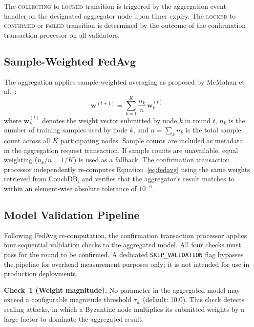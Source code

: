 \documentclass[lettersize,journal]{IEEEtran}
\begin{document}
The \textsc{collecting} to \textsc{locked} transition is triggered by the aggregation
event handler on the designated aggregator node upon timer expiry. The
\textsc{locked} to \textsc{confirmed} or \textsc{failed} transition is determined by
the outcome of the confirmation transaction processor on all validators.

\subsection{Sample-Weighted FedAvg}

The aggregation applies sample-weighted averaging as proposed by McMahan
et al.~\cite{mcmahan2017communication}:
\begin{equation}
    \mathbf{w}^{(t+1)} = \sum_{k=1}^{K} \frac{n_k}{n} \, \mathbf{w}_k^{(t)}
    \label{eq:fedavg}
\end{equation}
where $\mathbf{w}_k^{(t)}$ denotes the weight vector submitted by node $k$ in round $t$,
$n_k$ is the number of training samples used by node $k$, and $n = \sum_{k} n_k$ is the
total sample count across all $K$ participating nodes. Sample counts are included as
metadata in the aggregation request transaction. If sample counts are unavailable, equal
weighting ($n_k / n = 1/K$) is used as a fallback. The confirmation transaction processor
independently re-computes Equation~\eqref{eq:fedavg} using the same weights retrieved from
CouchDB, and verifies that the aggregator's result matches to within an element-wise
absolute tolerance of $10^{-6}$.

\subsection{Model Validation Pipeline}
\label{sec:validation}

Following FedAvg re-computation, the confirmation transaction processor applies four
sequential validation checks to the aggregated model. All four checks must pass for the
round to be confirmed. A dedicated \texttt{SKIP\_VALIDATION} flag bypasses the pipeline
for overhead measurement purposes only; it is not intended for use in production
deployments.

\textbf{Check~1 (Weight magnitude).} No parameter in the aggregated model may exceed a
configurable magnitude threshold $\tau_w$ (default: 10.0). This check detects scaling
attacks, in which a Byzantine node multiplies its submitted weights by a large factor to
dominate the aggregated result.
\end{document}
